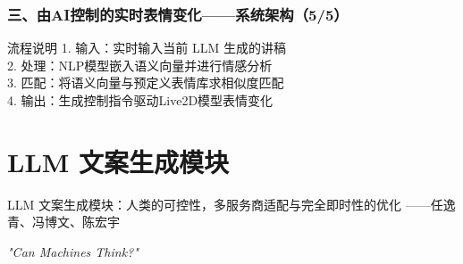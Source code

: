 \documentclass{beamer}
\begin{document}
\begin{frame}
    \frametitle{三、由AI控制的实时表情变化——系统架构（5/5）}

    \begin{block}{流程说明}
        1. 输入：实时输入当前 LLM 生成的讲稿\\
        2. 处理：NLP模型嵌入语义向量并进行情感分析\\
        3. 匹配：将语义向量与预定义表情库求相似度匹配\\
        4. 输出：生成控制指令驱动Live2D模型表情变化
    \end{block}
\end{frame}

\section{LLM 文案生成模块}

\begin {frame}{LLM 文案生成模块：人类的可控性，多服务商适配与完全即时性的优化
    \hfill ——任逸青、冯博文、陈宏宇}

\centering
\textit{"Can Machines Think?"} \\
\vspace {1em}
\end{frame}
\end{document}
